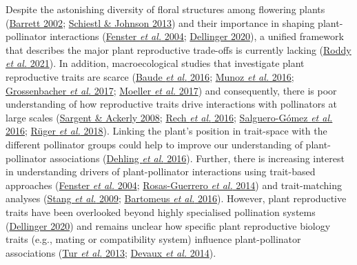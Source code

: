 \documentclass[
  12pt,
  a4paper,
]{article}
\begin{document}
Despite the astonishing diversity of floral structures among flowering plants (\protect\hyperlink{ref-barrett2002}{Barrett 2002}; \protect\hyperlink{ref-schiestl2013}{Schiestl \& Johnson 2013}) and their importance in shaping plant-pollinator interactions (\protect\hyperlink{ref-fenster2004}{Fenster \emph{et al.} 2004}; \protect\hyperlink{ref-dellinger2020}{Dellinger 2020}), a unified framework that describes the major plant reproductive trade-offs is currently lacking (\protect\hyperlink{ref-roddy2021}{Roddy \emph{et al.} 2021}). In addition, macroecological studies that investigate plant reproductive traits are scarce (\protect\hyperlink{ref-baude2016}{Baude \emph{et al.} 2016}; \protect\hyperlink{ref-munoz2016}{Munoz \emph{et al.} 2016}; \protect\hyperlink{ref-grossenbacher2017}{Grossenbacher \emph{et al.} 2017}; \protect\hyperlink{ref-moeller2017}{Moeller \emph{et al.} 2017}) and consequently, there is poor understanding of how reproductive traits drive interactions with pollinators at large scales (\protect\hyperlink{ref-sargent2008}{Sargent \& Ackerly 2008}; \protect\hyperlink{ref-rech2016}{Rech \emph{et al.} 2016}; \protect\hyperlink{ref-salguero2016}{Salguero-Gómez \emph{et al.} 2016}; \protect\hyperlink{ref-ruger2018}{Rüger \emph{et al.} 2018}). Linking the plant's position in trait-space with the different pollinator groups could help to improve our understanding of plant-pollinator associations (\protect\hyperlink{ref-dehling2016}{Dehling \emph{et al.} 2016}). Further, there is increasing interest in understanding drivers of plant-pollinator interactions using trait-based approaches (\protect\hyperlink{ref-fenster2004}{Fenster \emph{et al.} 2004}; \protect\hyperlink{ref-rosas2014}{Rosas-Guerrero \emph{et al.} 2014}) and trait-matching analyses (\protect\hyperlink{ref-stang2009}{Stang \emph{et al.} 2009}; \protect\hyperlink{ref-bartomeus2016}{Bartomeus \emph{et al.} 2016}). However, plant reproductive traits have been overlooked beyond highly specialised pollination systems (\protect\hyperlink{ref-dellinger2020}{Dellinger 2020}) and remains unclear how specific plant reproductive biology traits (e.g., mating or compatibility system) influence plant-pollinator associations (\protect\hyperlink{ref-tur2013}{Tur \emph{et al.} 2013}; \protect\hyperlink{ref-devaux2014}{Devaux \emph{et al.} 2014}).
\end{document}

